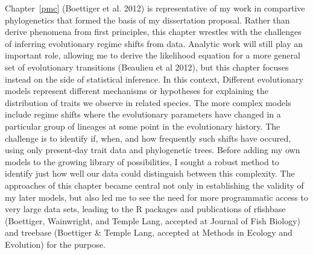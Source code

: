 
Chapter~\ref{pmc} (Boettiger et al. 2012) is representative of my work in compartive phylogenetics that formed the basis of my dissertation proposal.  Rather than derive phenomena from first principles, this chapter wrestles with the challenges of inferring evolutionary regime shifts from data.  Analytic work will still play an important role, allowing me to derive the likelihood equation for a more general set of evolutionary transitions (Beaulieu et al 2012), but this chapter focuses instead on the side of statistical inference. In this context, Different evolutionary models represent different mechanisms or hypotheses for explaining the distribution of traits we observe in related species.  The more complex models include regime shifts where the evolutionary parameters have changed in a particular group of lineages at some point in the evolutionary history.  The challenge is to identify if, when, and how frequently such shifts have occured, using only present-day trait data and phylogenetic trees. Before adding my own models to the growing library of possibilities, I sought a robust method to identify just how well our data could distinguish between this complexity.  The approaches of this chapter became central not only in establishing the validity of my later models, but also led me to see the need for more programmatic access to very large data sets, leading to the R packages and publications of rfishbase (Boettiger, Wainwright, and Temple Lang, accepted at Journal of Fish Biology) and treebase (Boettiger \& Temple Lang, accepted at Methods in Ecology and Evolution) for the purpose.   


